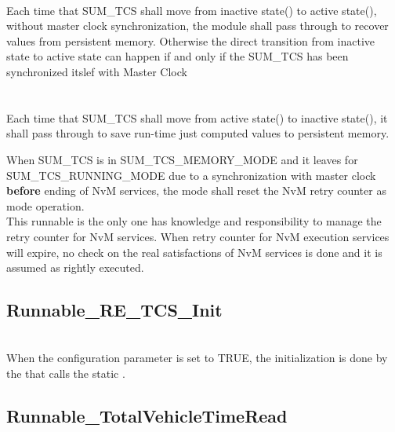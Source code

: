 
\\
Each time that SUM\_TCS shall move from inactive state() to active state(), without master clock synchronization, the module shall pass through
 to recover values from persistent memory. Otherwise the direct transition from inactive state to active state can happen if and only if the SUM\_TCS has been synchronized itslef with Master Clock\\
{}
\\
\\
Each time that SUM\_TCS shall move from active state() to inactive state(), it shall pass through  to save 
run-time just computed values to persistent memory.
\\
{}

When SUM\_TCS is in SUM_TCS_MEMORY_MODE and it leaves for SUM_TCS_RUNNING_MODE due to a synchronization with master clock \textbf{before} ending of NvM services,
the mode shall reset the NvM retry counter as mode operation.
\\
This runnable is the only one has knowledge and responsibility to manage the retry counter for NvM services. When retry counter for NvM execution services will expire, no check on the real satisfactions of NvM services is done and it is assumed as rightly executed.

\subsection{Runnable_RE_TCS_Init}
\label{subsec:RunnableTCSInit}

\\
When the configuration parameter  is set to TRUE, the initialization is done by the   that calls the static .
\\
{}



\subsection{Runnable_TotalVehicleTimeRead}
\label{subsec:RunTotVehicleTimeRead}

